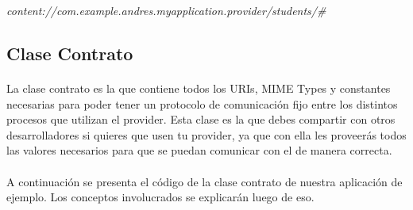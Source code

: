 \documentclass[10pt]{extarticle}
\begin{document}
\begin{center}
\textit{content://com.example.andres.myapplication.provider/students/\#}
\end{center}


\subsection{Clase Contrato}

\paragraph{}
La clase contrato es la que contiene todos los URIs, MIME Types y constantes necesarias para poder tener un protocolo de comunicación fijo entre los distintos procesos que utilizan el provider. Esta clase es la que debes compartir con otros desarrolladores si quieres que usen tu provider, ya que con ella les proveerás todos las valores necesarios para que se puedan comunicar con el de manera correcta.

\paragraph{}
A continuación se presenta el código de la clase contrato de nuestra aplicación de ejemplo. Los conceptos involucrados se explicarán luego de eso.
\end{document}
